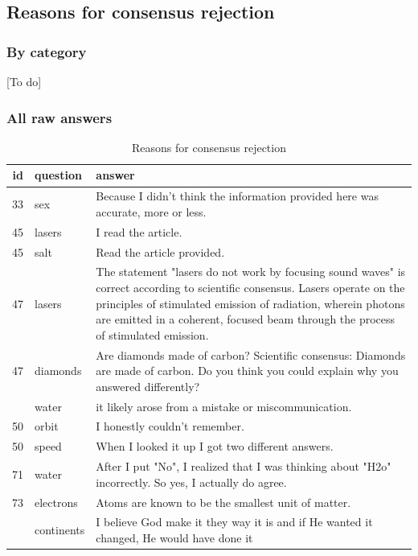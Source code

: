 \documentclass[
  doc,floatsintext]{apa6}
\begin{document}
\subsection{Reasons for consensus rejection}\label{reasons-for-consensus-rejection}

\subsubsection{By category}\label{by-category}

{[}To do{]}

\subsubsection{All raw answers}\label{all-raw-answers}

\begin{longtable}[t]{>{}r>{}l>{\raggedright\arraybackslash}p{30em}}
\caption{\label{tab:exp2-reasons-rejection}Reasons for consensus rejection}\\
\toprule
id & question & answer\\
\midrule
33 & sex & Because I didn't think the information provided here was accurate, more or less.\\
45 & lasers & I read the article.\\
45 & salt & Read the article provided.\\
47 & lasers & The statement "lasers do not work by focusing sound waves" is correct according to scientific consensus. Lasers operate on the principles of stimulated emission of radiation, wherein photons are emitted in a coherent, focused beam through the process of stimulated emission.\\
47 & diamonds & Are diamonds made of carbon? Scientific consensus: Diamonds are made of carbon.  Do you think you could explain why you answered differently?\\
\addlinespace
47 & water & it likely arose from a mistake or miscommunication.\\
50 & orbit & I honestly couldn't remember.\\
50 & speed & When I looked it up I got two different answers.\\
71 & water & After I put "No", I realized that I was thinking about "H2o" incorrectly. So yes, I actually do agree.\\
73 & electrons & Atoms are known to be the smallest unit of matter.\\
\addlinespace
77 & continents & I believe God make it they way it is and if He wanted it changed, He would have done it\\

\end{longtable}
\end{document}

